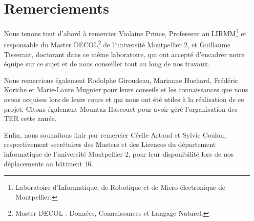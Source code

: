 \chapter*{Remerciements}

Nous tenons tout d'abord à remercier \mbox{Violaine} \mbox{Prince}, Professeur
au LIRMM\footnote{Laboratoire d'Informatique, de Robotique et de
Micro-électronique de Montpellier.} et responsable du Master
DECOL\footnote{Master DECOL : Données, Connaissances et Langage Naturel.} de
l'université Montpellier 2, et \mbox{Guillaume} \mbox{Tisserant}, doctorant dans
ce même laboratoire, qui ont accepté d'encadrer notre équipe sur ce sujet et de nous conseiller tout au long de nos travaux.

Nous remercions également \mbox{Rodolphe} \mbox{Giroudeau}, \mbox{Marianne}
\mbox{Huchard}, \mbox{Frédéric} \mbox{Koriche} et \mbox{Marie-Laure}
\mbox{Mugnier} pour leurs conseils et les connaissances que nous avons acquises
lors de leurs cours et qui nous ont été utiles à la réalisation de ce projet.
Citons également \mbox{Mountaz} \mbox{Hascouet} pour avoir géré l'organisation
des TER cette année.

Enfin, nous souhaitons finir par remercier \mbox{Cécile} \mbox{Artaud} et
\mbox{Sylvie} \mbox{Coulon}, respectivement secrétaires des Masters et des
Licences du département informatique de l'université Montpellier 2, pour leur
disponibilité lors de nos déplacements au bâtiment 16.

